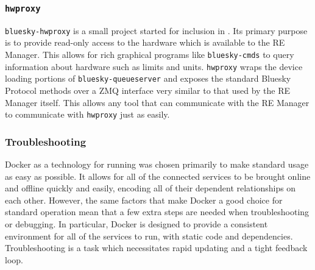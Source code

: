\subsubsection{\texttt{hwproxy}}

\texttt{bluesky-hwproxy}\cite{} is a small project started for inclusion in \biab.
Its primary purpose is to provide read-only access to the hardware which is available to the RE Manager.
This allows for rich graphical programs like \texttt{bluesky-cmds} to query information about hardware such as limits and units.
\texttt{hwproxy} wraps the device loading portions of \texttt{bluesky-queueserver} and exposes the standard Bluesky Protocol methods over a ZMQ interface very similar to that used by the RE Manager itself.
This allows any tool that can communicate with the RE Manager to communicate with \texttt{hwproxy} just as easily.

\subsubsection{Troubleshooting}

Docker as a technology for running \biab was chosen primarily to make standard usage as easy as possible.
It allows for all of the connected services to be brought online and offline quickly and easily, encoding all of their dependent relationships on each other.
However, the same factors that make Docker a good choice for standard operation mean that a few extra steps are needed when troubleshooting or debugging.
In particular, Docker is designed to provide a consistent environment for all of the services to run, with static code and dependencies.
Troubleshooting is a task which necessitates rapid updating and a tight feedback loop.

